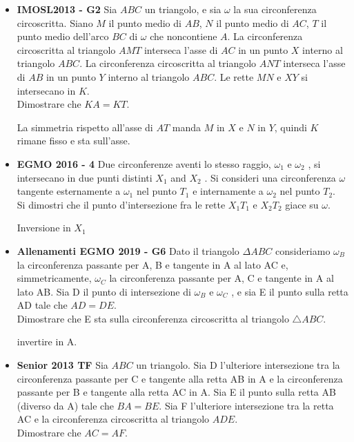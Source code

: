 \begin{itemize}
    \item \textbf{IMOSL2013 - G2}  Sia $ABC$ un triangolo, e sia $\omega$ la sua circonferenza circoscritta.  Siano $M$ il punto medio di $AB$, $N$ il punto medio di $AC$, $T$ il punto medio dell’arco $BC$ di $\omega$ che noncontiene $A$. La circonferenza circoscritta al triangolo $AMT$ interseca l’asse di $AC$ in un punto $X$ interno al triangolo $ABC$. La circonferenza circoscritta al triangolo $ANT$ interseca l’asse di $AB$ in un punto $Y$ interno al triangolo $ABC$. Le rette $MN$ e $XY$ si intersecano in $K$.\\
    Dimostrare che $KA=KT$.
    
    \begin{sol}La simmetria rispetto all'asse di $AT$ manda $M$ in $X$ e $N$ in $Y$, quindi $K$ rimane fisso e sta sull'asse.
    \end{sol}
    
    \item \textbf{EGMO 2016 - 4} Due circonferenze aventi lo stesso raggio, $\omega_1$ e $\omega_2$ , si intersecano in due punti distinti $X_1$ and $X_2$ . Si consideri una circonferenza $\omega$ tangente esternamente a $\omega_1$ nel punto $T_1$ e internamente a $\omega_2$ nel punto $T_2$.\\ Si dimostri che il punto d’intersezione fra le rette $X_1T_1$ e $X_2T_2$ giace su $\omega$.
    \begin{sol}
    Inversione in $X_1$
    \end{sol}
    
    \item \textbf{Allenamenti EGMO 2019 - G6}
    Dato il triangolo $\Delta ABC$ consideriamo $\omega_B$ la circonferenza passante per A, B e tangente in A al lato AC e, simmetricamente, $\omega_C$ la circonferenza passante per A, C e tangente in A al lato AB. Sia D il punto di intersezione di $\omega_B$ e $\omega_C$ , e sia E il punto sulla retta AD tale che $AD = DE$.\\
    Dimostrare che E sta sulla circonferenza circoscritta al triangolo $\triangle ABC$.

    \begin{sol}
    invertire in A.
    \end{sol}

    \item \textbf{Senior 2013 TF}
    Sia $ABC$ un triangolo. Sia D l’ulteriore intersezione tra la circonferenza passante per C e tangente alla retta AB in A e la circonferenza passante per B e tangente alla retta AC in A.
    Sia E il punto sulla retta AB (diverso da A) tale che $BA = BE$. Sia F l’ulteriore intersezione tra la retta AC e la circonferenza circoscritta al triangolo $ADE$.\\
    Dimostrare che $AC = AF$.


\end{itemize}
